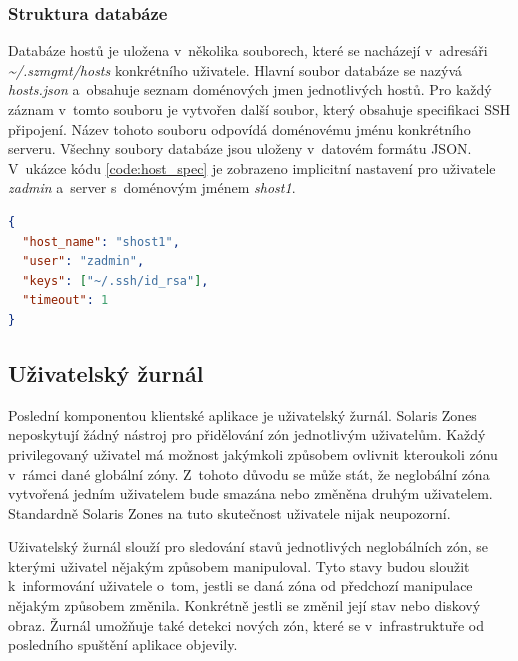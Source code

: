 \subsubsection{Struktura databáze}
\label{chapter:implementation:client:hosts:database}
Databáze hostů je uložena v~několika souborech, které se nacházejí v~adresáři \textit{\textasciitilde/.szmgmt/hosts} konkrétního uživatele.
Hlavní soubor databáze se nazývá \textit{hosts.json} a~obsahuje seznam doménových jmen jednotlivých hostů. Pro každý záznam 
v~tomto souboru je vytvořen další soubor, který obsahuje specifikaci SSH připojení. Název tohoto souboru odpovídá doménovému
jménu konkrétního serveru. Všechny soubory databáze jsou uloženy v~datovém formátu JSON. V~ukázce kódu \ref{code:host_spec}
je zobrazeno implicitní nastavení pro uživatele \textit{zadmin} a~server s~doménovým jménem \textit{shost1}.
\begin{lstlisting}[language=json, caption={Implicitní nastavení parametrů SSH připojení}, float,label={code:host_spec}]  
{
  "host_name": "shost1",
  "user": "zadmin",
  "keys": ["~/.ssh/id_rsa"],
  "timeout": 1
}
\end{lstlisting}
\subsection{Uživatelský žurnál}
\label{chapter:implementation:client:journal}
Poslední komponentou klientské aplikace je uživatelský žurnál. Solaris Zones neposkytují žádný nástroj pro přidělování zón 
jednotlivým uživatelům. Každý privilegovaný uživatel má možnost jakýmkoli způsobem ovlivnit kteroukoli zónu v~rámci dané globální
zóny. Z~tohoto důvodu se může stát, že neglobální zóna vytvořená jedním uživatelem bude smazána nebo změněna druhým uživatelem.
Standardně Solaris Zones na tuto skutečnost uživatele nijak neupozorní. 

Uživatelský žurnál slouží pro sledování stavů jednotlivých neglobálních zón, se kterými uživatel nějakým způsobem manipuloval.
Tyto stavy budou sloužit k~informování uživatele o~tom, jestli se daná zóna od předchozí manipulace nějakým způsobem změnila.
Konkrétně jestli se změnil její stav nebo diskový obraz. Žurnál umožňuje také detekci nových zón, které se v~infrastruktuře
od posledního spuštění aplikace objevily.

